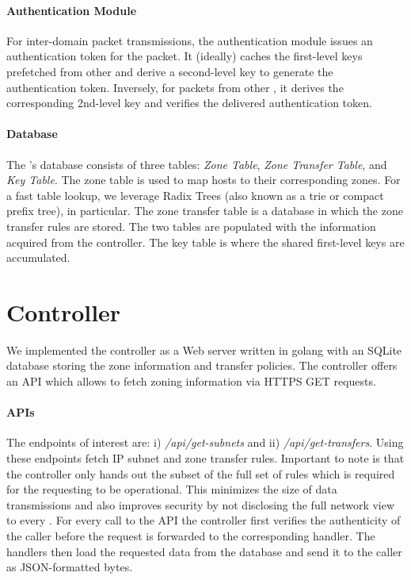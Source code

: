 \paragraph{Authentication Module}
For inter-domain packet transmissions, the authentication module issues an 
authentication token for the packet. It (ideally) caches the first-level keys prefetched
from other \tps and derive a second-level key to generate the authentication token. 
Inversely, for packets from other \tps, it derives the corresponding 2nd-level key
and verifies the delivered authentication token.

\paragraph{Database}
The \tp's database consists of three tables: \textit{Zone Table}, \textit{Zone Transfer 
Table}, and \textit{Key Table}. The zone table is used to map hosts to their corresponding 
zones. For a fast table lookup, we leverage Radix Trees (also known as a trie or compact prefix 
tree),  in particular. The zone transfer table is a database 
in which the zone transfer rules are stored. The two tables are populated with the information 
acquired from the controller. The key table is where the shared first-level keys are 
accumulated. 

\section{Controller}
\label{sec:controller}

We implemented the controller as a Web server written in golang with an SQLite database storing the 
zone information and transfer policies. The controller offers an API which allows
\tps to fetch zoning information via HTTPS GET requests.

\paragraph{APIs}
The endpoints of interest are: i) \textit{/api/get-subnets} and ii) \textit{/api/get-transfers}.
Using these endpoints \tps fetch IP subnet and zone transfer rules. Important to note is that 
the controller only hands out the subset of the full set of rules which is required for the 
requesting \tp to be operational. This minimizes the size of data transmissions and also 
improves security by not disclosing the full network view to every \tp. For every call to the 
API the controller first verifies the authenticity of the caller before the request is forwarded 
to the corresponding handler. The handlers then load the requested data from the database and 
send it to the caller as JSON-formatted bytes.


